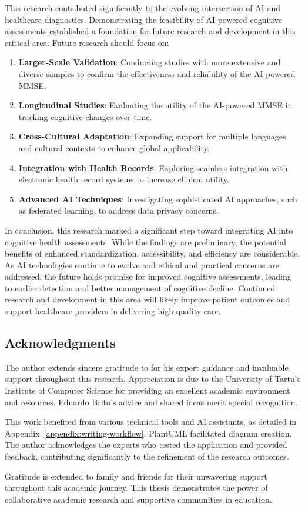 This research contributed significantly to the evolving intersection of AI and healthcare diagnostics. Demonstrating the feasibility of AI-powered cognitive assessments established a foundation for future research and development in this critical area.
Future research should focus on:
\begin{enumerate}
\item \textbf{Larger-Scale Validation}: Conducting studies with more extensive and diverse samples to confirm the effectiveness and reliability of the AI-powered MMSE.
\item \textbf{Longitudinal Studies}: Evaluating the utility of the AI-powered MMSE in tracking cognitive changes over time.
\item \textbf{Cross-Cultural Adaptation}: Expanding support for multiple languages and cultural contexts to enhance global applicability.
\item \textbf{Integration with Health Records}: Exploring seamless integration with electronic health record systems to increase clinical utility.
\item \textbf{Advanced AI Techniques}: Investigating sophisticated AI approaches, such as federated learning, to address data privacy concerns.
\end{enumerate}
In conclusion, this research marked a significant step toward integrating AI into cognitive health assessments. While the findings are preliminary, the potential benefits of enhanced standardization, accessibility, and efficiency are considerable. As AI technologies continue to evolve and ethical and practical concerns are addressed, the future holds promise for improved cognitive assessments, leading to earlier detection and better management of cognitive decline. Continued research and development in this area will likely improve patient outcomes and support healthcare providers in delivering high-quality care.

\subsection*{Acknowledgments}
The author extends sincere gratitude to \supervisordr{} for his expert guidance and invaluable support throughout this research. Appreciation is due to the University of Tartu's Institute of Computer Science for providing an excellent academic environment and resources. Eduardo Brito's advice and shared ideas merit special recognition.

This work benefited from various technical tools and AI assistants, as detailed in Appendix~\ref{appendix:writing-workflow}. PlantUML facilitated diagram creation. The author acknowledges the experts who tested the application and provided feedback, contributing significantly to the refinement of the research outcomes.

Gratitude is extended to family and friends for their unwavering support throughout this academic journey. This thesis demonstrates the power of collaborative academic research and supportive communities in education.